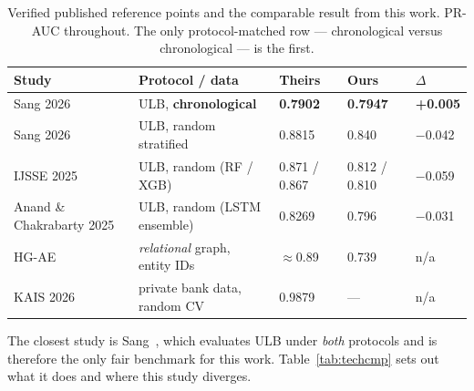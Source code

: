 \documentclass[11pt,a4paper]{article}
\begin{document}
\begin{table}[h]
      \centering\small
      \caption{Verified published reference points and the comparable result from this work.
      PR-AUC throughout. The only protocol-matched row --- chronological versus chronological
      --- is the first.}
      \label{tab:refpos}
      \begin{tabularx}{\textwidth}{lXlll}
            \toprule
            Study & Protocol / data & Theirs & Ours & $\Delta$\\
            \midrule
            Sang 2026~\cite{eai2026} & ULB, \textbf{chronological} & \textbf{0.7902} & \textbf{0.7947} & \textbf{+0.005}\\
            Sang 2026~\cite{eai2026} & ULB, random stratified & 0.8815 & 0.840 & $-$0.042\\
            IJSSE 2025~\cite{ijsse2025} & ULB, random (RF / XGB) & 0.871 / 0.867 & 0.812 / 0.810 & $-$0.059\\
            Anand \& Chakrabarty 2025~\cite{anand2025} & ULB, random (LSTM ensemble) & 0.8269 & 0.796 & $-$0.031\\
            HG-AE~\cite{hgae2024} & \emph{relational} graph, entity IDs & $\approx$0.89 & 0.739 & n/a\\
            KAIS 2026~\cite{kais2026} & private bank data, random CV & 0.9879 & --- & n/a\\
            \bottomrule
      \end{tabularx}
\end{table}

The closest study is Sang~\cite{eai2026}, which evaluates ULB under \emph{both} protocols and is
therefore the only fair benchmark for this work. Table~\ref{tab:techcmp} sets out what it does
and where this study diverges.
\end{document}
